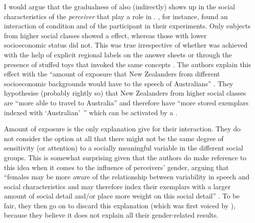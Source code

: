 I would argue that the gradualness of  also (indirectly) shows up in the social characteristics of the \emph{perceiver} that play a role in .
\textcite{hayetal2006a,haydrager2010}, for instance, found an interaction of  condition and  of the participant in their experiments.
Only subjects from higher social classes showed a  effect, whereas those with lower socioeconomic status did not.
This was true irrespective of whether  was achieved with the help of explicit regional labels on the answer sheets or through the presence of stuffed toys that invoked the same concepts \parencite[cf.][878]{haydrager2010}.
The authors explain this effect with the ``amount of exposure  that New Zealanders from different socioeconomic backgrounds would have to the speech of Australians'' \parencite[878]{haydrager2010}.
They hypothesise (probably rightly so) that New Zealanders from higher social classes are ``more able to travel to Australia'' and therefore have ``more stored exemplars indexed with `Australian'~'' which can be activated by a .

Amount of exposure is the only explanation \citeauthor{haydrager2010} give for their  interaction.
They do not consider the option at all that there might not be the same degree of sensitivity (or attention) to a socially meaningful variable in the different social groups.
This is somewhat surprising given that the authors do make reference to this idea when it comes to the influence of perceivers' gender, arguing that ``females may be more aware of the relationship between variability in speech and social characteristics and may therefore index their exemplars with a larger amount of social detail and/or place more weight on this social detail'' \parencite[884]{haydrager2010}.
To be fair, they then go on to discard this explanation (which was first voiced by \cite{drager2005}), because they believe it does not explain all their gender-related results.


